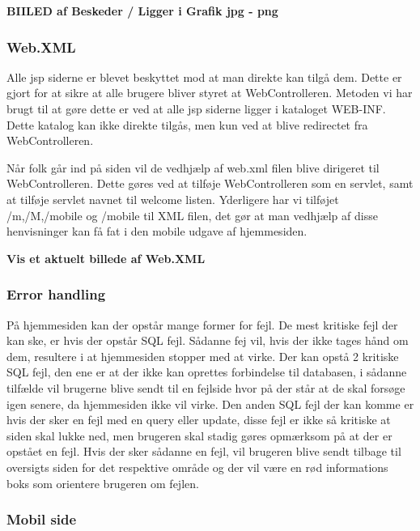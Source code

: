 \documentclass[a4paper]{article}
\begin{document}
\textbf{BIILED af Beskeder / Ligger i Grafik jpg - png}


\subsubsection{Web.XML} %

Alle jsp siderne er blevet beskyttet mod at man direkte kan tilgå dem. Dette er gjort for at sikre at alle brugere bliver styret at WebControlleren. Metoden vi har brugt til at gøre dette er ved at alle jsp siderne ligger i kataloget WEB-INF. Dette katalog kan ikke direkte tilgås, men kun ved at blive redirectet fra WebControlleren. 

Når folk går ind på siden vil de vedhjælp af web.xml filen blive dirigeret til WebControlleren. Dette gøres ved at tilføje WebControlleren som en servlet, samt at tilføje servlet navnet til welcome listen. Yderligere har vi tilføjet /m,/M,/mobile og /mobile til XML filen, det gør at man vedhjælp af disse henvisninger kan få fat i den mobile udgave af hjemmesiden.

\textbf{Vis et aktuelt billede af Web.XML}


\subsubsection{Error handling} %

På hjemmesiden kan der opstår mange former for fejl. De mest kritiske fejl der kan ske, er hvis der opstår SQL fejl. Sådanne fej vil, hvis der ikke tages hånd om dem, resultere i at hjemmesiden stopper med at virke. Der kan opstå 2 kritiske SQL fejl, den ene er at der ikke kan oprettes forbindelse til databasen, i sådanne tilfælde vil brugerne blive sendt til en fejlside hvor på der står at de skal forsøge igen senere, da hjemmesiden ikke vil virke. Den anden SQL fejl der kan komme er hvis der sker en fejl med en query eller update, disse fejl er ikke så kritiske at siden skal lukke ned, men brugeren skal stadig gøres opmærksom på at der er opstået en fejl. Hvis der sker sådanne en fejl, vil brugeren blive sendt tilbage til oversigts siden for det respektive område og der vil være en rød informations boks som orientere brugeren om fejlen.


\subsubsection{Mobil side} %
\end{document}
